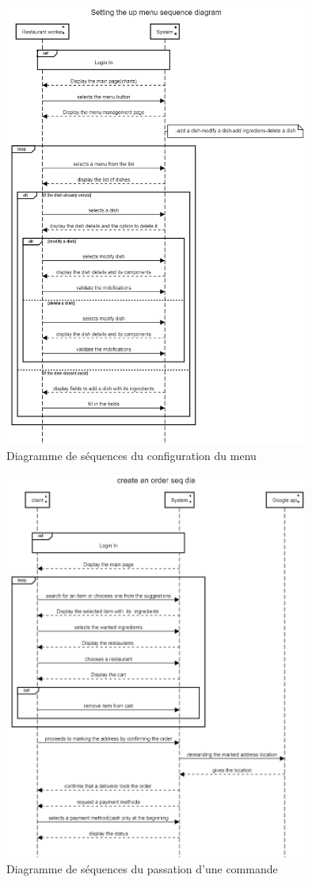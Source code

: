 \documentclass[french, a4paper, french]{report}
\begin{document}
			\begin{figure}[!h]
  				\center
  				\includegraphics[width=10cm]{seqmenu.png}
  				\caption{Diagramme de séquences du configuration du menu}
  				\label{fig:seqmenu}
			\end{figure}
			\begin{figure}[!h]
  				\center
  				\includegraphics[width=10cm]{seqorder.png}
  				\caption{Diagramme de séquences du passation d'une commande}
  				\label{fig:seqorder}
			\end{figure}
\end{document}
